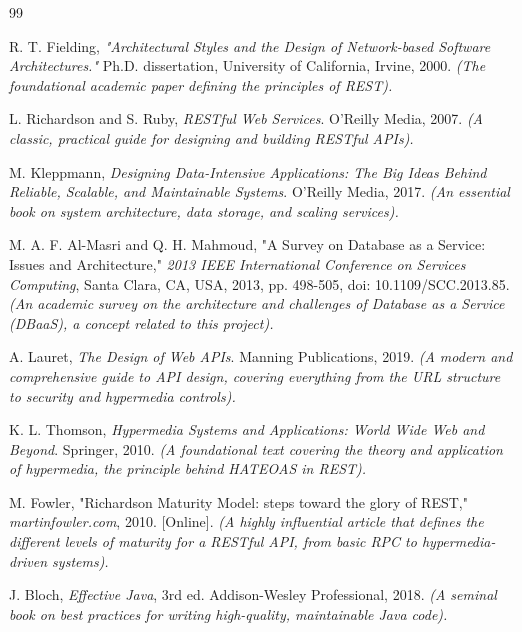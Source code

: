\documentclass[12pt, a4paper]{report}
\begin{document}
\begin{thebibliography}{99}

R. T. Fielding, \textit{"Architectural Styles and the Design of Network-based Software Architectures."} Ph.D. dissertation, University of California, Irvine, 2000.
\textit{(The foundational academic paper defining the principles of REST).}

L. Richardson and S. Ruby, \textit{RESTful Web Services}. O'Reilly Media, 2007.
\textit{(A classic, practical guide for designing and building RESTful APIs).}

M. Kleppmann, \textit{Designing Data-Intensive Applications: The Big Ideas Behind Reliable, Scalable, and Maintainable Systems}. O'Reilly Media, 2017.
\textit{(An essential book on system architecture, data storage, and scaling services).}

M. A. F. Al-Masri and Q. H. Mahmoud, "A Survey on Database as a Service: Issues and Architecture," \textit{2013 IEEE International Conference on Services Computing}, Santa Clara, CA, USA, 2013, pp. 498-505, doi: 10.1109/SCC.2013.85.
\textit{(An academic survey on the architecture and challenges of Database as a Service (DBaaS), a concept related to this project).}

A. Lauret, \textit{The Design of Web APIs}. Manning Publications, 2019.
\textit{(A modern and comprehensive guide to API design, covering everything from the URL structure to security and hypermedia controls).}

K. L. Thomson, \textit{Hypermedia Systems and Applications: World Wide Web and Beyond}. Springer, 2010.
\textit{(A foundational text covering the theory and application of hypermedia, the principle behind HATEOAS in REST).}

M. Fowler, "Richardson Maturity Model: steps toward the glory of REST," \textit{martinfowler.com}, 2010. [Online]. 
\textit{(A highly influential article that defines the different levels of maturity for a RESTful API, from basic RPC to hypermedia-driven systems).}

J. Bloch, \textit{Effective Java}, 3rd ed. Addison-Wesley Professional, 2018.
\textit{(A seminal book on best practices for writing high-quality, maintainable Java code).}

\end{thebibliography}
\end{document}
